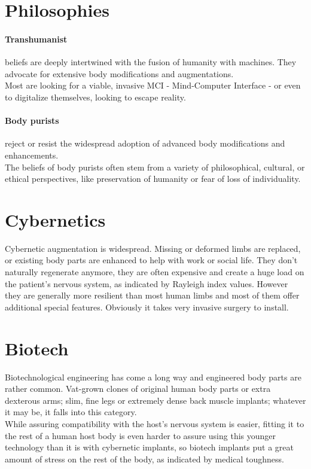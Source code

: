 \section{Philosophies}
\paragraph{Transhumanist}
beliefs are deeply intertwined with the fusion of humanity with machines.
They advocate for extensive body modifications and augmentations.\\
Most are looking for a viable, invasive MCI - Mind-Computer Interface -
	or even to digitalize themselves,
	looking to escape reality.
\paragraph{Body purists} reject or resist the widespread adoption of advanced body modifications and enhancements.\\
The beliefs of body purists often stem from a variety of philosophical, cultural, or ethical perspectives, like preservation of humanity or fear of loss of individuality.

\section{Cybernetics}
Cybernetic augmentation is widespread.
Missing or deformed limbs are replaced,
	or existing body parts are enhanced to help with work or social life.
They don’t naturally regenerate anymore,
	they are often expensive
	and create a huge load on the patient’s nervous system,
	as indicated by Rayleigh index values.
However they are generally more resilient than most human limbs
	and most of them offer additional special features.
Obviously it takes very invasive surgery to install.
\section{Biotech}
Biotechnological engineering has come a long way and engineered body parts are rather common. Vat-grown clones of original human body parts or extra dexterous arms; slim, fine legs or extremely dense back muscle implants; whatever it may be, it falls into this category.\\
While assuring compatibility with the host's nervous system is easier, fitting it to the rest of a human host body is even harder to assure using this younger technology than it is with cybernetic implants, so biotech implants put a great amount of stress on the rest of the body, as indicated by medical toughness.
